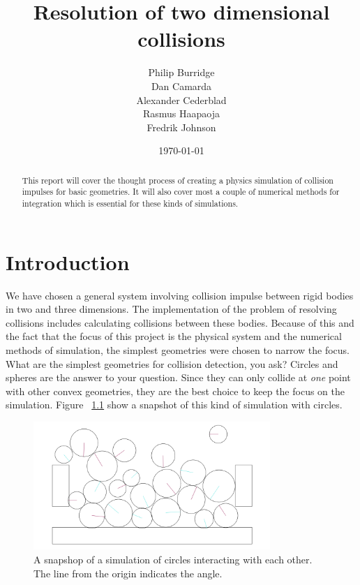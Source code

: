 \documentclass[a4paper,12pt]{report}
\title{Resolution of two dimensional collisions}
\author{Philip Burridge\\
        Dan Camarda\\
        Alexander Cederblad\\
        Rasmus Haapaoja\\
        Fredrik Johnson}
\date{\today}
\begin{document}
\maketitle


\begin{abstract}
This report will cover the thought process of creating a physics simulation of collision impulses for basic geometries. It will also cover most a couple of numerical methods for integration which is essential for these kinds of simulations.
\end{abstract}


\tableofcontents
{}


\chapter{Introduction}
\setcounter{page}{1}

We have chosen a general system involving collision impulse between rigid bodies in two and three dimensions. The implementation of the problem of resolving collisions includes calculating collisions between these bodies. Because of this and the fact that the focus of this project is the physical system and the numerical methods of simulation, the simplest geometries were chosen to narrow the focus. What are the simplest geometries for collision detection, you ask? Circles and spheres are the answer to your question. Since they can only collide at \emph{one} point with other convex geometries, they are the best choice to keep the focus on the simulation. Figure ~\ref{fig:snapshot} show a snapshot of this kind of simulation with circles.

\begin{figure}[!ht]
    \centering
    \includegraphics[width=0.8\textwidth]{figures/snapshot.png}
    \caption{A snapshop of a simulation of circles interacting with each other. The line from the origin indicates the angle.}
    \label{fig:snapshot}
\end{figure}
\end{document}

